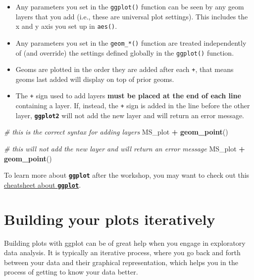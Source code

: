 \documentclass[]{book}
\newenvironment{Shaded}{\begin{snugshade}}{\end{snugshade}}
\newcommand{\KeywordTok}[1]{\textcolor[rgb]{0.13,0.29,0.53}{\textbf{#1}}}
\newcommand{\StringTok}[1]{\textcolor[rgb]{0.31,0.60,0.02}{#1}}
\newcommand{\CommentTok}[1]{\textcolor[rgb]{0.56,0.35,0.01}{\textit{#1}}}
\newcommand{\OperatorTok}[1]{\textcolor[rgb]{0.81,0.36,0.00}{\textbf{#1}}}
\newcommand{\NormalTok}[1]{#1}
\providecommand{\tightlist}{%
  \setlength{\itemsep}{0pt}\setlength{\parskip}{0pt}}
\theoremstyle{definition}
\theoremstyle{definition}
\theoremstyle{definition}
\theoremstyle{remark}
\begin{document}
\begin{itemize}
\tightlist
\item
  Any parameters you set in the \texttt{ggplot()} function can be seen
  by any geom layers that you add (i.e., these are universal plot
  settings). This includes the x and y axis you set up in
  \texttt{aes()}.
\item
  Any parameters you set in the \texttt{geom\_*()} function are treated
  independently of (and override) the settings defined globally in the
  \texttt{ggplot()} function.
\item
  Geoms are plotted in the order they are added after each \texttt{+},
  that means geoms last added will display on top of prior geoms.
\item
  The \texttt{+} sign used to add layers \textbf{must be placed at the
  end of each line} containing a layer. If, instead, the \texttt{+} sign
  is added in the line before the other layer, \textbf{\texttt{ggplot2}}
  will not add the new layer and will return an error message.
\end{itemize}

\begin{Shaded}
\begin{Highlighting}[]
\CommentTok{# this is the correct syntax for adding layers}
\NormalTok{MS_plot }\OperatorTok{+}
\StringTok{  }\KeywordTok{geom_point}\NormalTok{()}

\CommentTok{# this will not add the new layer and will return an error message}
\NormalTok{MS_plot}
  \OperatorTok{+}\StringTok{ }\KeywordTok{geom_point}\NormalTok{()}
\end{Highlighting}
\end{Shaded}

To learn more about \textbf{\texttt{ggplot}} after the workshop, you may
want to check out this
\href{https://www.rstudio.com/wp-content/uploads/2016/11/ggplot2-cheatsheet-2.1.pdf}{cheatsheet
about \textbf{\texttt{ggplot}}}.

\section{Building your plots
iteratively}\label{building-your-plots-iteratively}

Building plots with ggplot can be of great help when you engage in
exploratory data analysis. It is typically an iterative process, where
you go back and forth between your data and their graphical
representation, which helps you in the process of getting to know your
data better.
\end{document}

